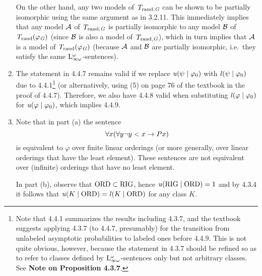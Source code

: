 \begin{enumerate}[1.]
On the other hand, any two models of $\mathit{T}_{\mathrm{rand}, \mathit{G}}$ can be shown to be partially isomorphic using the same argument as in 3.2.11. This immediately implies that any model $\mathcal{A}$ of $\mathit{T}_{\mathrm{rand}, \mathit{G}}$ is partially isomorphic to any model $\mathcal{B}$ of $\mathit{T}_{\mathrm{rand}}(\varphi_{\mathit{G}})$ (since $\mathcal{B}$ is also a model of $\mathit{T}_{\mathrm{rand}, \mathit{G}}$), which in turn implies that $\mathcal{A}$ is a model of $\mathit{T}_{\mathrm{rand}}(\varphi_{\mathit{G}})$ (because $\mathcal{A}$ and $\mathcal{B}$ are partially isomorphic, i.e.\ they satisfy the same $\inflog[\omega]$-sentences).
%
\item {} The statement in 4.4.7 remains valid if we replace $\uprob(\psi \wrt \varphi_0)$ with $\lprob(\psi \wrt \varphi_0)$ due to 4.4.1\footnote{Note that 4.4.1 summarizes the results including 4.3.7, and the textbook suggests applying 4.3.7 (to 4.4.7, presumably) for the transition from unlabeled asymptotic probabilities to labeled ones before 4.4.9. This is not quite obvious, however, because the statement in 4.3.7 should be refined so as to refer to classes defined by $\inflog[\omega]$-sentences only but not arbitrary classes. See \textbf{Note on Proposition 4.3.7}.} (or alternatively, using (5) on page 76 of the textbook in the proof of 4.4.7). Therefore, we also have 4.4.8 valid when substituting $\lprob(\varphi \wrt \varphi_0)$ for $\uprob(\varphi \wrt \varphi_0)$, which implies 4.4.9.
%
\item {} Note that in part (a) the sentence
\[
\forall x (\forall y \neg y < x \rightarrow Px)
\]
is equivalent to $\varphi$ over finite linear orderings (or more generally, over linear orderings that have the least element). These sentences are not equivalent over (infinite) orderings that have no least element.

In part (b), observe that $\ordclass \subset \rigid$, hence $\uprob(\rigid \wrt \ordclass) = 1$ and by 4.3.4 it follows that $\uprob(K \wrt \ordclass) = \lprob(K \wrt \ordclass)$ for any class $K$.
%
\end{enumerate}


\setcounter{section}{4}
